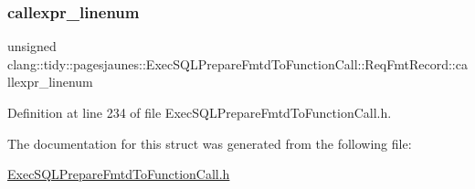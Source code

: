 \subsubsection{\texorpdfstring{callexpr\+\_\+linenum}{callexpr\_linenum}}
{\footnotesize\ttfamily unsigned clang\+::tidy\+::pagesjaunes\+::\+Exec\+S\+Q\+L\+Prepare\+Fmtd\+To\+Function\+Call\+::\+Req\+Fmt\+Record\+::callexpr\+\_\+linenum}



Definition at line 234 of file Exec\+S\+Q\+L\+Prepare\+Fmtd\+To\+Function\+Call.\+h.



The documentation for this struct was generated from the following file\+:\begin{DoxyCompactItemize}
\item 
\hyperlink{_exec_s_q_l_prepare_fmtd_to_function_call_8h}{Exec\+S\+Q\+L\+Prepare\+Fmtd\+To\+Function\+Call.\+h}\end{DoxyCompactItemize}
